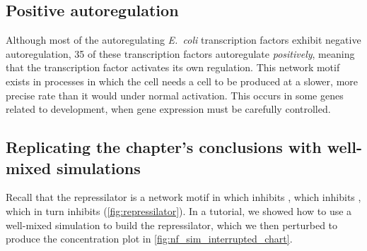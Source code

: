 \subsection{Positive autoregulation}

Although most of the autoregulating \textit{E.~coli} transcription factors exhibit negative autoregulation, 35 of these transcription factors autoregulate \textit{positively}, meaning that the transcription factor activates its own regulation. This network motif exists in processes in which the cell needs a cell to be produced at a slower, more precise rate than it would under normal activation. This occurs in some genes related to development, when gene expression must be carefully controlled.\\

\begin{exercise}\end{exercise}


\subsection{Replicating the chapter's conclusions with well-mixed simulations}

Recall that the repressilator is a network motif in which  inhibits , which inhibits , which in turn inhibits  (\autoref{fig:repressilator}). In a tutorial, we showed how to use a well-mixed simulation to build the repressilator, which we then perturbed to produce the concentration plot in \autoref{fig:nf_sim_interrupted_chart}.\\

\begin{exercise}\end{exercise}
